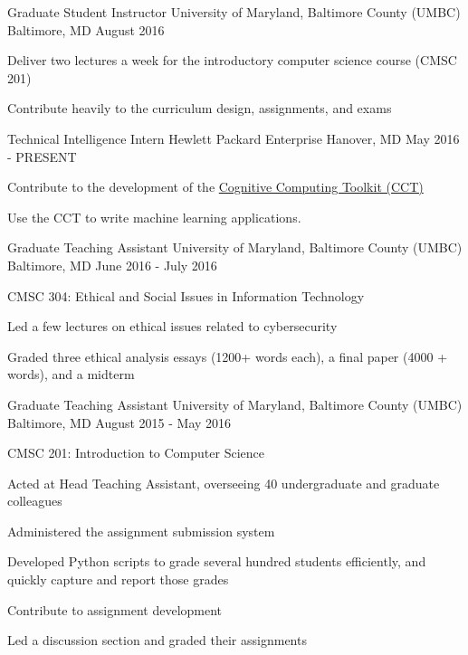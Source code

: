 \begin{cventries}

\cventry
{Graduate Student Instructor}
{University of Maryland, Baltimore County (UMBC)}
{Baltimore, MD}
{August 2016}
{
    \begin{cvitems}
        \item{Deliver two lectures a week for the introductory computer science course (CMSC 201)}
        \item{Contribute heavily to the curriculum design, assignments, and exams}
    \end{cvitems}
}

\cventry
{Technical Intelligence Intern}
{Hewlett Packard Enterprise}
{Hanover, MD}
{May 2016 - PRESENT}
{
    \begin{cvitems}
        \item{Contribute to the development of the \href{https://github.com/hpe-cct}{Cognitive Computing Toolkit (CCT)}}
        \item{Use the CCT to write machine learning applications.}
    \end{cvitems}
}

\cventry
{Graduate Teaching Assistant}
{University of Maryland, Baltimore County (UMBC)}
{Baltimore, MD}
{June 2016 - July 2016}
{
    \begin{cvitems}
        \item {CMSC 304: Ethical and Social Issues in Information Technology}
        \item{Led a few lectures on ethical issues related to cybersecurity}
        \item{Graded three ethical analysis essays (1200+ words each), a final paper (4000 + words), and a midterm}
    \end{cvitems}
}

\cventry
{Graduate Teaching Assistant}
{University of Maryland, Baltimore County (UMBC)}
{Baltimore, MD}
{August 2015 - May 2016}
{
    \begin{cvitems}
        \item{CMSC 201: Introduction to Computer Science}
        \item {Acted at Head Teaching Assistant, overseeing 40 undergraduate and graduate colleagues}
        \item {Administered the assignment submission system}
        \item {Developed Python scripts to grade several hundred students efficiently, and quickly capture and report those grades}
        \item {Contribute to assignment development}
        \item{Led a discussion section and graded their assignments}
    \end{cvitems}
}


\end{cventries}
